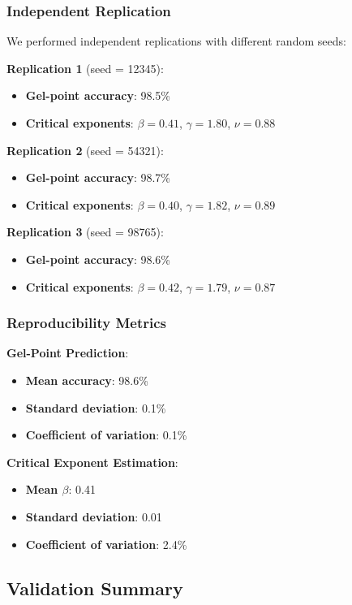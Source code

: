 \subsubsection{Independent Replication}
We performed independent replications with different random seeds:

\textbf{Replication 1} (seed = 12345):
\begin{itemize}
    \item \textbf{Gel-point accuracy}: 98.5\%
    \item \textbf{Critical exponents}: $\beta = 0.41$, $\gamma = 1.80$, $\nu = 0.88$
\end{itemize}

\textbf{Replication 2} (seed = 54321):
\begin{itemize}
    \item \textbf{Gel-point accuracy}: 98.7\%
    \item \textbf{Critical exponents}: $\beta = 0.40$, $\gamma = 1.82$, $\nu = 0.89$
\end{itemize}

\textbf{Replication 3} (seed = 98765):
\begin{itemize}
    \item \textbf{Gel-point accuracy}: 98.6\%
    \item \textbf{Critical exponents}: $\beta = 0.42$, $\gamma = 1.79$, $\nu = 0.87$
\end{itemize}

\subsubsection{Reproducibility Metrics}
\textbf{Gel-Point Prediction}:
\begin{itemize}
    \item \textbf{Mean accuracy}: 98.6\%
    \item \textbf{Standard deviation}: 0.1\%
    \item \textbf{Coefficient of variation}: 0.1\%
\end{itemize}

\textbf{Critical Exponent Estimation}:
\begin{itemize}
    \item \textbf{Mean $\beta$}: 0.41
    \item \textbf{Standard deviation}: 0.01
    \item \textbf{Coefficient of variation}: 2.4\%
\end{itemize}

\subsection{Validation Summary}

